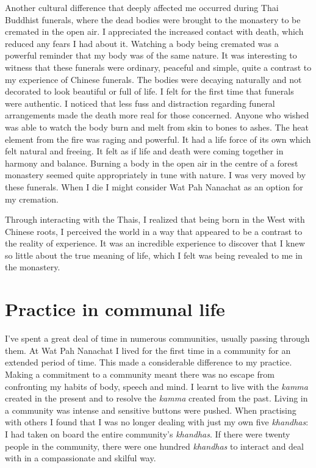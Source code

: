 Another cultural difference that deeply affected me occurred during Thai
Buddhist funerals, where the dead bodies were brought to the monastery
to be cremated in the open air. I appreciated the increased contact with
death, which reduced any fears I had about it. Watching a body being
cremated was a powerful reminder that my body was of the same nature. It
was interesting to witness that these funerals were ordinary, peaceful
and simple, quite a contrast to my experience of Chinese funerals. The
bodies were decaying naturally and not decorated to look beautiful or
full of life. I felt for the first time that funerals were authentic. I
noticed that less fuss and distraction regarding funeral arrangements
made the death more real for those concerned. Anyone who wished was able
to watch the body burn and melt from skin to bones to ashes. The heat
element from the fire was raging and powerful. It had a life force of
its own which felt natural and freeing. It felt as if life and death
were coming together in harmony and balance. Burning a body in the open
air in the centre of a forest monastery seemed quite appropriately in
tune with nature. I was very moved by these funerals. When I die I might
consider Wat Pah Nanachat as an option for my cremation. 

Through interacting with the Thais, I realized that being born in the
West with Chinese roots, I perceived the world in a way that appeared to
be a contrast to the reality of experience. It was an incredible
experience to discover that I knew so little about the true meaning of
life, which I felt was being revealed to me in the monastery. 

\section{Practice in communal life}

I've spent a great deal of time in numerous communities, usually passing
through them. At Wat Pah Nanachat I lived for the first time in a
community for an extended period of time. This made a considerable
difference to my practice. Making a commitment to a community meant
there was no escape from confronting my habits of body, speech and mind. 
I learnt to live with the \emph{kamma} created in the present and to
resolve the \emph{kamma} created from the past. Living in a community
was intense and sensitive buttons were pushed. When practising with
others I found that I was no longer dealing with just my own five
\emph{khandhas}: I had taken on board the entire community's
\emph{khandhas}. If there were twenty people in the community, there
were one hundred \emph{khandhas} to interact and deal with in a
compassionate and skilful way. 

